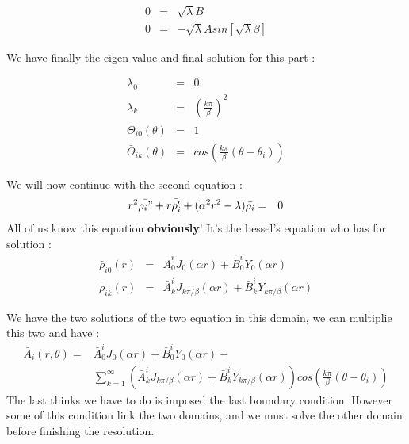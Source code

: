 \begin{eqnarray}
0 &=& \sqrt \lambda B  \\
0 &=& -\sqrt \lambda A sin[\sqrt \lambda \beta] 
\end{eqnarray}

We have finally the eigen-value and final solution for this part :

\begin{eqnarray}
\lambda_0 &=& 0\\
\lambda_k &=& \left( \frac{k\pi}{\beta}\right)^2 \\
\bar{\Theta}_{i0}(\theta) &=& 1\\
\bar{\Theta}_{ik}(\theta) &=& cos\left(\frac{k\pi}{\beta}(\theta-\theta_i)\right)
\end{eqnarray}

We will now continue with the second equation :
\begin{eqnarray}
r^2\bar{\rho_i"}+r\bar{\rho_i'}+(\alpha^2r^2-\lambda)\bar{\rho_i}&=&0
\end{eqnarray}
All of us know this equation \textbf{obviously}! It's the bessel's equation who has for solution :
\begin{eqnarray}
\bar{\rho}_{i0}(r) &=& \bar{A}_0^i J_0(\alpha r) + \bar{B}_0^iY_0(\alpha r)\\
\bar{\rho}_{ik}(r) &=& \bar{A}_k^i J_{k\pi/\beta}(\alpha r) + \bar{B}_{k}^iY_{k\pi/\beta}(\alpha r)
\end{eqnarray}

We have the two solutions of the two equation in this domain, we can multiplie this two and have :
\begin{eqnarray}\label{42}
\bar{A}_i(r,\theta) =  &\bar{A}_0^i J_0(\alpha r) + \bar{B}_0^i Y_0(\alpha r) + \\ 
& \sum_{k=1}^\infty \left( \bar{A}_k^i J_{k\pi/\beta}(\alpha r) + \bar{B}_k^i Y_{k\pi/\beta}(\alpha r) \right) cos\left( \frac{k\pi}{\beta} (\theta-\theta_i)\right)
\end{eqnarray}
The last thinks we have to do is imposed the last boundary condition. However some of this condition link the two domains, and we must solve the other domain before finishing the resolution.

